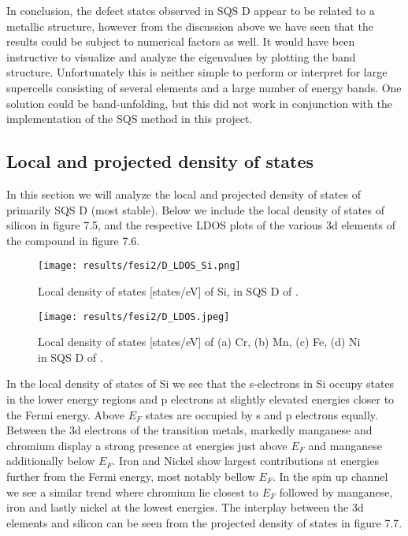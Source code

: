In conclusion, the defect states observed in SQS D appear to be related to a metallic structure, however from the discussion above we have seen that the results could be subject to numerical factors as well. It would have been instructive to visualize and analyze the eigenvalues by plotting the band structure. Unfortunately this is neither simple to perform or interpret for large supercells consisting of several elements and a large number of energy bands. One solution could be band-unfolding, but this did not work in conjunction with the implementation of the SQS method in this project. 

\subsection{Local and projected density of states}
In this section we will analyze the local and projected density of states of primarily SQS D (most stable). Below we include the local density of states of silicon in figure 7.5, and the respective LDOS plots of the various 3d elements of the compound in figure 7.6.  
  
\begin{figure}[H]
	\centering
	\texttt{[image: results/fesi2/D\_LDOS\_Si.png]}
	\caption{Local density of states [states/eV] of Si, in SQS D of .}
\end{figure} 

\begin{figure}[H]
	\centering
	\texttt{[image: results/fesi2/D\_LDOS.jpeg]}
	\caption{Local density of states [states/eV] of (a) Cr, (b) Mn, (c) Fe, (d) Ni in SQS D of .}
\end{figure}   
  
In the local density of states of Si we see that the s-electrons in Si occupy states in the lower energy regions and p electrons at slightly elevated energies closer to the Fermi energy. Above $E_F$ states are occupied by s and p electrons equally. Between the 3d electrons of the transition metals, markedly manganese and chromium display a strong presence at energies just above $E_F$ and manganese additionally below $E_F$. Iron and Nickel show largest contributions at energies further from the Fermi energy, most notably bellow $E_F$. In the spin up channel we see a similar trend where chromium lie closest to $E_F$ followed by manganese, iron and lastly nickel at the lowest energies. The interplay between the 3d elements and silicon can be seen from the projected density of states in figure 7.7.

